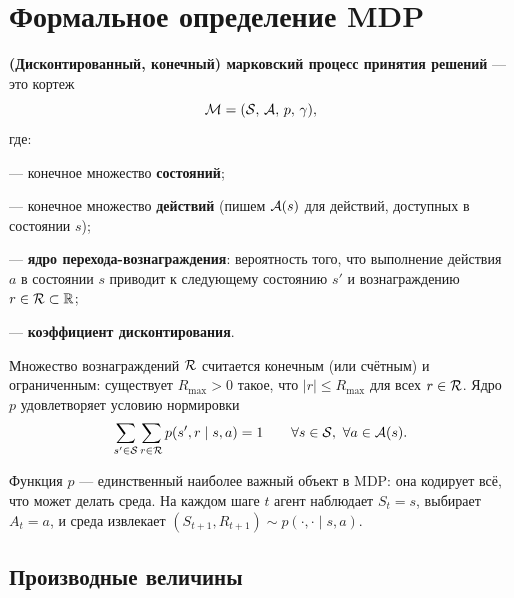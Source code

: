 \section{Формальное определение MDP}
\label{sec:mdp-definition}

\begin{definition}
\label{def:mdp}
\textbf{(Дисконтированный, конечный) марковский процесс принятия решений} — это кортеж
\begin{equation}
\label{eq:mdp-tuple}
\mathcal{M} = (\mathcal{S},\, \mathcal{A},\, p,\, \gamma),
\end{equation}
где:
\begin{description}[
    style=unboxed,
    leftmargin=0pt,
    labelindent=0pt,
    labelsep=0.4em,
    itemsep=2pt,
    topsep=4pt,
    parsep=0pt,
    font=\normalfont
  ]
  \item[$\cS$] — конечное множество \textbf{состояний};
  \item[$\cA$] — конечное множество \textbf{действий} (пишем $\mathcal{A}(s)$ для действий, доступных в состоянии $s$);
  \item[$p(s',r \mid s, a)$] — \textbf{ядро перехода-вознаграждения}: вероятность того, что выполнение действия $a$ в состоянии $s$ приводит к следующему состоянию $s'$ и вознаграждению $r \in \mathcal{R} \subset \mathbb{R}$;
  \item[$\gamma \in [0, 1)$] — \textbf{коэффициент дисконтирования}.
\end{description}
Множество вознаграждений $\mathcal{R}$ считается конечным (или счётным) и ограниченным: существует $R_{\max} > 0$ такое, что $|r| \le R_{\max}$ для всех $r \in \mathcal{R}$. Ядро $p$ удовлетворяет условию нормировки
\begin{equation}
\label{eq:normalisation}
\sum_{s' \in \mathcal{S}} \sum_{r \in \mathcal{R}} p(s', r \mid s, a) = 1
\qquad \forall s \in \mathcal{S},\ \forall a \in \mathcal{A}(s).
\end{equation}
\end{definition}

Функция $p$ — единственный наиболее важный объект в MDP: она кодирует всё, что может делать среда. На каждом шаге $t$ агент наблюдает $S_t = s$, выбирает $A_t = a$, и среда извлекает $(S_{t+1}, R_{t+1}) \sim p(\cdot, \cdot \mid s, a)$.

\subsection*{Производные величины}

